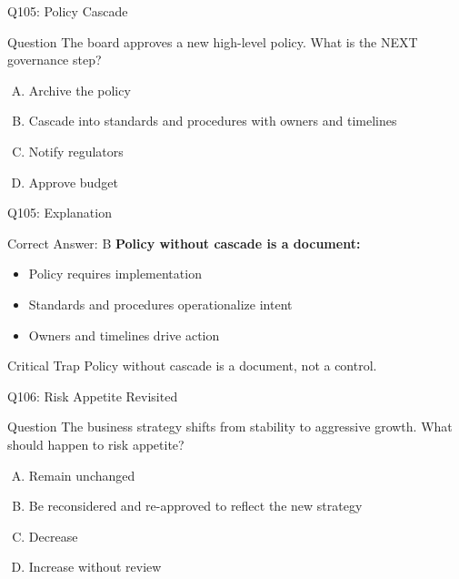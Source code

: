 \documentclass{beamer}
\begin{document}
	\begin{frame}{Q105: Policy Cascade}
		\begin{block}{Question}
			The board approves a new high-level policy. What is the NEXT governance step?
		\end{block}
		\begin{enumerate}[(A)]
			\item Archive the policy
			\item Cascade into standards and procedures with owners and timelines
			\item Notify regulators
			\item Approve budget
		\end{enumerate}
	\end{frame}
	
	\begin{frame}{Q105: Explanation}
		\begin{block}{Correct Answer: B}
			\textbf{Policy without cascade is a document:}
			\begin{itemize}
				\item Policy requires implementation
				\item Standards and procedures operationalize intent
				\item Owners and timelines drive action
			\end{itemize}
		\end{block}
		\begin{alertblock}{Critical Trap}
			Policy without cascade is a document, not a control.
		\end{alertblock}
	\end{frame}
	
	\begin{frame}{Q106: Risk Appetite Revisited}
		\begin{block}{Question}
			The business strategy shifts from stability to aggressive growth. What should happen to risk appetite?
		\end{block}
		\begin{enumerate}[(A)]
			\item Remain unchanged
			\item Be reconsidered and re-approved to reflect the new strategy
			\item Decrease
			\item Increase without review
		\end{enumerate}
	\end{frame}
	
\end{document}
